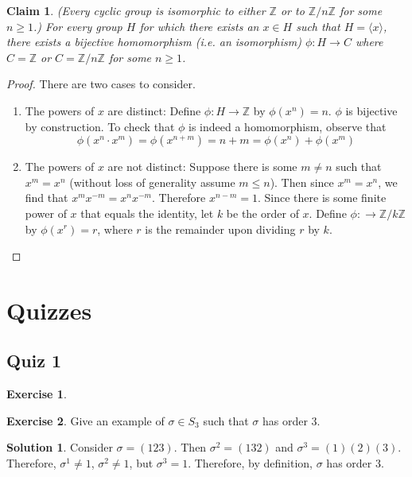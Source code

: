 \documentclass[12pt]{article}
\newtheorem{claim}{Claim}
\theoremstyle{definition}
\newtheorem{exercise}{Exercise}
\theoremstyle{definition}
\newtheorem{solution}[theorem]{Solution}
\begin{document}
\begin{claim}(Every cyclic group is isomorphic to either $\mathbb{Z}$ or to $\mathbb{Z} / n \mathbb{Z}$ for some $n \geq 1$.) For every group $H$ for which there exists an $x \in H$ such that $H = \langle x \rangle$, there exists a bijective homomorphism (i.e. an isomorphism) $\phi : H \to C$ where $C = \mathbb{Z}$ or $C = \mathbb{Z} / n \mathbb{Z}$ for some $n \geq 1$.
\end{claim}
\begin{proof}
There are two cases to consider. 
\begin{enumerate}
	\item The powers of $x$ are distinct: Define $\phi : H \to \mathbb{Z}$ by $\phi(x^n) = n$. $\phi$ is bijective by construction. To check that $\phi$ is indeed a homomorphism, observe that
	\begin{equation}
		\phi(x^n \cdot x^m) = \phi(x^{n+m}) = n + m = \phi(x^n) + \phi(x^m)
	\end{equation}
	\item The powers of $x$ are not distinct: Suppose there is some $m \neq n$ such that $x^m = x^n$ (without loss of generality assume $m \leq n$). Then since $x^m = x^n$, we find that $x^m x^{-m} = x^n x^{-m}$. Therefore $x^{n-m} = 1$. Since there is some finite power of $x$ that equals the identity, let $k$ be the order of $x$. Define $\phi : \to \mathbb{Z} / k \mathbb{Z}$ by $\phi(x^r) = r$, where $r$ is the remainder upon dividing $r$ by $k$. 
\end{enumerate}
\end{proof}

\section{Quizzes}
\subsection{Quiz 1}

\begin{exercise}

\end{exercise}

\begin{exercise}
Give an example of $\sigma \in S_3$ such that $\sigma$ has order 3. 
\end{exercise}
\begin{solution}
Consider $\sigma = (1 2 3)$. Then $\sigma^2 = (1 3 2)$ and $\sigma^3 = (1)(2)(3)$. Therefore, $\sigma^1 \neq 1$, $\sigma^2 \neq 1$, but $\sigma^3 = 1$. Therefore, by definition, $\sigma$ has order $3$.
\end{solution}
\end{document}
